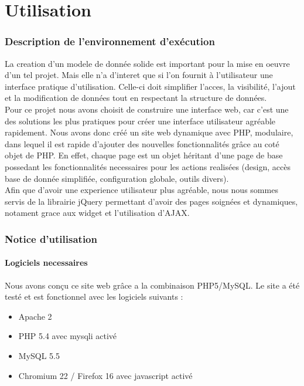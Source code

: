 \documentclass[a4paper, 11pt]{article}
\begin{document}
\newpage
\part{Utilisation}
\setcounter{section}{0}
\section{Description de l'environnement d'exécution}
La creation d'un modele de donnée solide est important pour la mise en oeuvre d'un tel projet. Mais elle n'a d'interet que si l'on fournit à l'utilisateur une interface pratique d'utilisation. Celle-ci doit simplifier l'acces, la visibilité, l'ajout et la modification de données tout en respectant la structure de données.
\\Pour ce projet nous avons choisit de construire une interface web, car c'est une des solutions les plus pratiques pour créer une interface utilisateur agréable rapidement. Nous avons donc créé un site web dynamique avec PHP, modulaire, dans lequel il est rapide d'ajouter des nouvelles fonctionnalités grâce au coté objet de PHP. En effet, chaque page est un objet héritant d'une page de base possedant les fonctionnalités necessaires pour les actions realisées (design, accès base de donnée simplifiée, configuration globale, outils divers). 
\\Afin que d'avoir une experience utilisateur plus agréable, nous nous sommes servis de la librairie jQuery permettant d'avoir des pages soignées et dynamiques, notament grace aux widget et l'utilisation d'AJAX. 
\section{Notice d'utilisation}
\subsection{Logiciels necessaires}
Nous avons conçu ce site web grâce a la combinaison PHP5/MySQL.
Le site a été testé et est fonctionnel avec les logiciels suivants :
\begin{itemize}
\item Apache 2
\item PHP 5.4 avec mysqli activé
\item MySQL 5.5
\item Chromium 22 / Firefox 16 avec javascript activé
\end{itemize}
\end{document}
